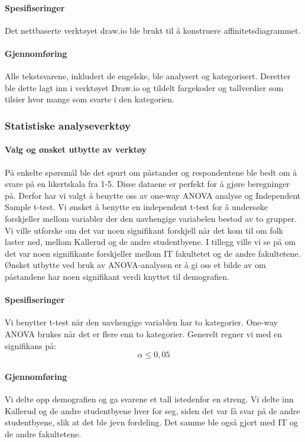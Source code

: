 \paragraph{Spesifiseringer}
Det nettbaserte verktøyet draw.io ble brukt til å konstruere affinitetsdiagrammet. 

\paragraph{Gjennomføring}
Alle tekstsvarene, inkludert de engelske, ble analysert og kategorisert. Deretter ble dette lagt inn i verktøyet Draw.io og tildelt fargekoder og tallverdier som tilsier hvor mange som svarte i den kategorien. 


\subsubsection{Statistiske analyseverktøy}

\paragraph{Valg og ønsket utbytte av verktøy}
På enkelte spørsmål ble det spurt om påstander og respondentene ble bedt om å svare på en likertskala fra 1-5. Disse dataene er perfekt for å gjøre beregninger på. Derfor har vi valgt å benytte oss av one-way ANOVA analyse og Independent Sample t-test. Vi ønsket å benytte en independent t-test for å undersøke forskjeller mellom variabler der den uavhengige variabelen bestod av to grupper. Vi ville utforske om det var noen signifikant forskjell når det kom til om folk laster ned, mellom Kallerud og de andre studentbyene. I tillegg ville vi se på om det var noen signifikante forskjeller mellom IT fakultetet og de andre fakultetene. Ønsket utbytte ved bruk av ANOVA-analysen er å gi oss et bilde av om påstandene har noen signifikant verdi knyttet til demografien.

\paragraph{Spesifiseringer}
Vi benytter t-test når den uavhengige variablen har to kategorier. One-way ANOVA brukes når det er flere enn to kategorier. Generelt regner vi med en signifikans på: \[\alpha \le 0,05\]

\paragraph{Gjennomføring}
Vi delte opp demografien og ga svarene et tall istedenfor en streng. Vi delte inn Kallerud og de andre studentbyene hver for seg, siden det var få svar på de andre studentbyene, slik at det ble jevn fordeling. Det samme ble også gjort med IT og de andre fakultetene. 

